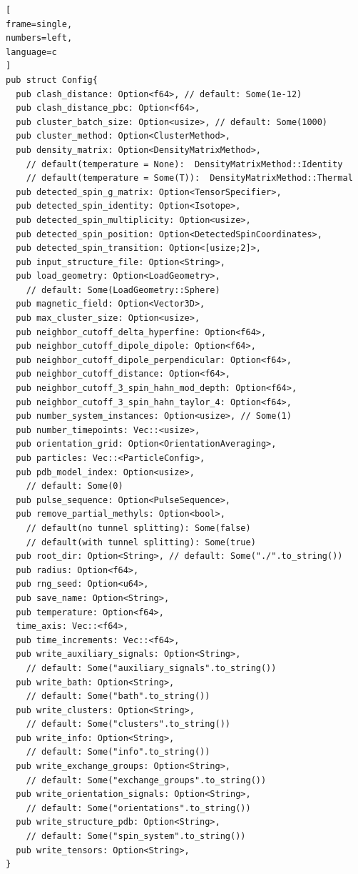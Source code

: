 \documentclass{book}
\begin{document}
\begin{lstlisting}[
frame=single,
numbers=left,
language=c
]
pub struct Config{
  pub clash_distance: Option<f64>, // default: Some(1e-12)
  pub clash_distance_pbc: Option<f64>,
  pub cluster_batch_size: Option<usize>, // default: Some(1000)
  pub cluster_method: Option<ClusterMethod>,
  pub density_matrix: Option<DensityMatrixMethod>,
    // default(temperature = None):  DensityMatrixMethod::Identity
    // default(temperature = Some(T)):  DensityMatrixMethod::Thermal
  pub detected_spin_g_matrix: Option<TensorSpecifier>,
  pub detected_spin_identity: Option<Isotope>,
  pub detected_spin_multiplicity: Option<usize>,
  pub detected_spin_position: Option<DetectedSpinCoordinates>,
  pub detected_spin_transition: Option<[usize;2]>,
  pub input_structure_file: Option<String>,
  pub load_geometry: Option<LoadGeometry>, 
    // default: Some(LoadGeometry::Sphere)
  pub magnetic_field: Option<Vector3D>,
  pub max_cluster_size: Option<usize>,
  pub neighbor_cutoff_delta_hyperfine: Option<f64>,
  pub neighbor_cutoff_dipole_dipole: Option<f64>,
  pub neighbor_cutoff_dipole_perpendicular: Option<f64>,
  pub neighbor_cutoff_distance: Option<f64>,
  pub neighbor_cutoff_3_spin_hahn_mod_depth: Option<f64>,
  pub neighbor_cutoff_3_spin_hahn_taylor_4: Option<f64>,
  pub number_system_instances: Option<usize>, // Some(1)
  pub number_timepoints: Vec::<usize>,
  pub orientation_grid: Option<OrientationAveraging>,
  pub particles: Vec::<ParticleConfig>,
  pub pdb_model_index: Option<usize>,
    // default: Some(0)
  pub pulse_sequence: Option<PulseSequence>,
  pub remove_partial_methyls: Option<bool>,
    // default(no tunnel splitting): Some(false)
    // default(with tunnel splitting): Some(true)
  pub root_dir: Option<String>, // default: Some("./".to_string())
  pub radius: Option<f64>,
  pub rng_seed: Option<u64>,
  pub save_name: Option<String>,
  pub temperature: Option<f64>,
  time_axis: Vec::<f64>,
  pub time_increments: Vec::<f64>,
  pub write_auxiliary_signals: Option<String>, 
    // default: Some("auxiliary_signals".to_string())
  pub write_bath: Option<String>,
    // default: Some("bath".to_string())
  pub write_clusters: Option<String>,
    // default: Some("clusters".to_string())
  pub write_info: Option<String>,
    // default: Some("info".to_string())
  pub write_exchange_groups: Option<String>,
    // default: Some("exchange_groups".to_string())
  pub write_orientation_signals: Option<String>,
    // default: Some("orientations".to_string())
  pub write_structure_pdb: Option<String>,
    // default: Some("spin_system".to_string())
  pub write_tensors: Option<String>,
}
\end{lstlisting}
\printbibliography
\end{document}
